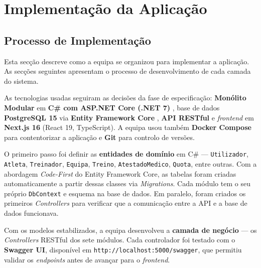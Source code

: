 
\chapter{Implementação da Aplicação}\label{chap:implementacao}


\section{Processo de Implementação}

Esta secção descreve como a equipa se organizou para implementar a aplicação. As secções seguintes apresentam o processo de desenvolvimento de cada camada do sistema.

As tecnologias usadas seguiram as decisões da fase de especificação: \textbf{Monólito Modular} em \textbf{C\# com ASP.NET Core (.NET 7)} \cite{aspnetcore2023}, base de dados \textbf{PostgreSQL 15} \cite{postgresql2024} via \textbf{Entity Framework Core} \cite{efcore2023}, \textbf{API RESTful} e \textit{frontend} em \textbf{Next.js 16} \cite{nextjs2024} (React 19, TypeScript). A equipa usou também \textbf{Docker Compose} \cite{docker2024} para contentorizar a aplicação e \textbf{Git} para controlo de versões.

O primeiro passo foi definir as \textbf{entidades de domínio} em C\# --- \texttt{Utilizador}, \texttt{Atleta}, \texttt{Treinador}, \texttt{Equipa}, \texttt{Treino}, \texttt{AtestadoMedico}, \texttt{Quota}, entre outras. Com a abordagem \textit{Code-First} do Entity Framework Core, as tabelas foram criadas automaticamente a partir dessas classes via \textit{Migrations}. Cada módulo tem o seu próprio \texttt{DbContext} e esquema na base de dados. Em paralelo, foram criados os primeiros \textit{Controllers} para verificar que a comunicação entre a API e a base de dados funcionava.

Com os modelos estabilizados, a equipa desenvolveu a \textbf{camada de negócio} --- os \textit{Controllers} RESTful dos sete módulos. Cada controlador foi testado com o \textbf{Swagger UI}, disponível em \texttt{http://localhost:5000/swagger}, que permitiu validar os \textit{endpoints} antes de avançar para o \textit{frontend}.

